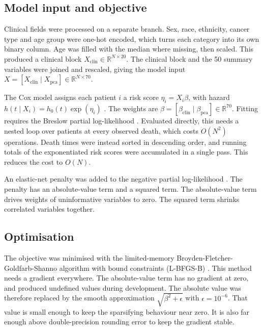 \documentclass[10pt,a4paper]{article}
\begin{document}
\subsection{Model input and objective}

Clinical fields were processed on a separate branch. Sex, race, ethnicity,
cancer type and age group were one-hot encoded, which turns each category into
its own binary column. Age was filled with the median where missing, then
scaled. This produced a clinical block
$X_{\text{clin}} \in \mathbb{R}^{N \times 20}$. The clinical block and the
50 summary variables were joined and rescaled, giving the model input
$X = [X_{\text{clin}} \mid X_{\text{pca}}] \in \mathbb{R}^{N \times 70}$.

The Cox model assigns each patient $i$ a risk score $\eta_i = X_i \beta$, with
hazard $h(t \mid X_i) = h_0(t) \exp(\eta_i)$ \citep{cox1972regression}. The
weights are $\beta = [\beta_{\text{clin}} \mid \beta_{\text{pca}}] \in
\mathbb{R}^{70}$. Fitting requires the Breslow partial log-likelihood
\citep{breslow1972discussion}. Evaluated directly, this needs a nested loop over
patients at every observed death, which costs $O(N^2)$ operations. Death times
were instead sorted in descending order, and running totals of the exponentiated
risk scores were accumulated in a single pass. This reduces the cost to $O(N)$.

An elastic-net penalty was added to the negative partial log-likelihood
\citep{zou2005regularization, wu2012elastic}. The penalty has an absolute-value
term and a squared term. The absolute-value term drives weights of uninformative
variables to zero. The squared term shrinks correlated variables together.

\subsection{Optimisation}

The objective was minimised with the limited-memory
Broyden-Fletcher-Goldfarb-Shanno algorithm with bound constraints (L-BFGS-B)
\citep{byrd1995limited}. This method needs a gradient everywhere. The
absolute-value term has no gradient at zero, and produced undefined values
during development. The absolute value was therefore replaced by the smooth
approximation $\sqrt{\beta^2 + \epsilon}$ with $\epsilon = 10^{-6}$. That value
is small enough to keep the sparsifying behaviour near zero. It is also far
enough above double-precision rounding error to keep the gradient stable.
\end{document}
